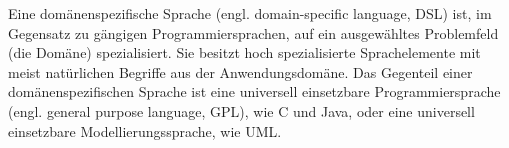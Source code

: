\documentclass[11pt,english,ngerman, headsepline]{scrreprt}
\begin{document}
%  
% 
% 


Eine domänenspezifische Sprache (engl. domain-specific language, DSL) ist, im
Gegensatz zu gängigen Programmiersprachen, auf ein ausgewähltes
 Problemfeld (die Domäne) spezialisiert. Sie besitzt hoch spezialisierte
Sprachelemente mit meist natürlichen Begriffe aus der Anwendungsdomäne.
Das Gegenteil einer domänenspezifischen Sprache ist eine universell einsetzbare
Programmiersprache (engl. general purpose language, GPL), wie C und Java, oder
eine universell einsetzbare Modellierungssprache, wie UML.
\end{document}
